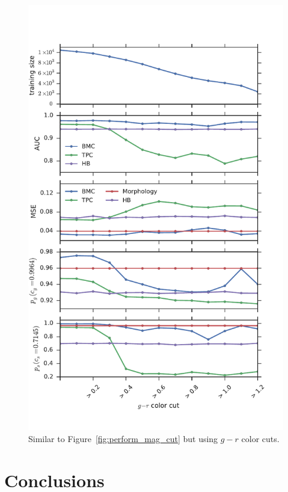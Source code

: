 \documentclass[useAMS,usenatbib]{mn2e}
\begin{document}
\begin{figure}
    \centering
    \includegraphics[width=\columnwidth]{figures/perform_g_r_cut.pdf}
    \caption{Similar to Figure~\ref{fig:perform_mag_cut}
        but using $g - r$ color cuts.}
    \label{fig:perform_g_r_cut}
\end{figure}

\section{Conclusions}
  \label{section:conclusions}
\end{document}
